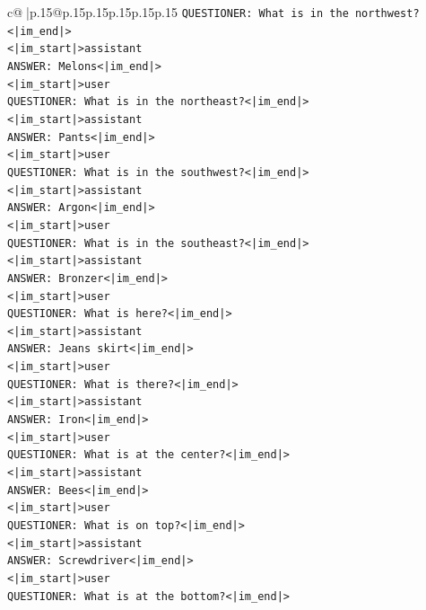 \documentclass{article}
\begin{document}
{\begin{supertabular}{c@{$\;$}|p{.15\linewidth}@{}p{.15\linewidth}p{.15\linewidth}p{.15\linewidth}p{.15\linewidth}p{.15\linewidth}}
{{{\texttt{QUESTIONER: What is in the northwest?<|im\_end|>} \\
\texttt{<|im\_start|>assistant} \\
\texttt{ANSWER: Melons<|im\_end|>} \\
\texttt{<|im\_start|>user} \\
\texttt{QUESTIONER: What is in the northeast?<|im\_end|>} \\
\texttt{<|im\_start|>assistant} \\
\texttt{ANSWER: Pants<|im\_end|>} \\
\texttt{<|im\_start|>user} \\
\texttt{QUESTIONER: What is in the southwest?<|im\_end|>} \\
\texttt{<|im\_start|>assistant} \\
\texttt{ANSWER: Argon<|im\_end|>} \\
\texttt{<|im\_start|>user} \\
\texttt{QUESTIONER: What is in the southeast?<|im\_end|>} \\
\texttt{<|im\_start|>assistant} \\
\texttt{ANSWER: Bronzer<|im\_end|>} \\
\texttt{<|im\_start|>user} \\
\texttt{QUESTIONER: What is here?<|im\_end|>} \\
\texttt{<|im\_start|>assistant} \\
\texttt{ANSWER: Jeans skirt<|im\_end|>} \\
\texttt{<|im\_start|>user} \\
\texttt{QUESTIONER: What is there?<|im\_end|>} \\
\texttt{<|im\_start|>assistant} \\
\texttt{ANSWER: Iron<|im\_end|>} \\
\texttt{<|im\_start|>user} \\
\texttt{QUESTIONER: What is at the center?<|im\_end|>} \\
\texttt{<|im\_start|>assistant} \\
\texttt{ANSWER: Bees<|im\_end|>} \\
\texttt{<|im\_start|>user} \\
\texttt{QUESTIONER: What is on top?<|im\_end|>} \\
\texttt{<|im\_start|>assistant} \\
\texttt{ANSWER: Screwdriver<|im\_end|>} \\
\texttt{<|im\_start|>user} \\
\texttt{QUESTIONER: What is at the bottom?<|im\_end|>} \\
}}}
\end{supertabular}}
\end{document}
